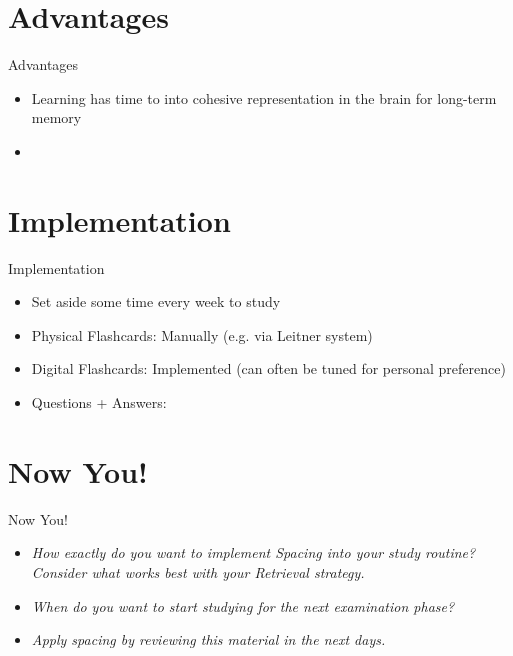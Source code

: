\documentclass{ercisbeamer}
\begin{document}
\section{Advantages}
\begin{frame}{Advantages}
    \begin{itemize}
        \item Learning has time to  into cohesive representation in the brain for long-term memory
        \item {}
    \end{itemize}
\end{frame}

\section{Implementation}
\begin{frame}{Implementation}
    \begin{itemize}
        \item Set aside some time every week  to study
        \item Physical Flashcards: Manually (e.g. via Leitner system)
        \item Digital Flashcards: Implemented  (can often be tuned for personal preference)
        \item Questions + Answers: 
    \end{itemize}
\end{frame}

\section{Now You!}
\begin{frame}{Now You!}
    \begin{itemize}
        \item \emph{How exactly do you want to implement Spacing into your study routine? \\ Consider what works best with your Retrieval strategy.}
        \item \emph{When do you want to start studying for the next examination phase?}
        \item \emph{Apply spacing by reviewing this material in the next days.}
    \end{itemize}
\end{frame}
\end{document}
